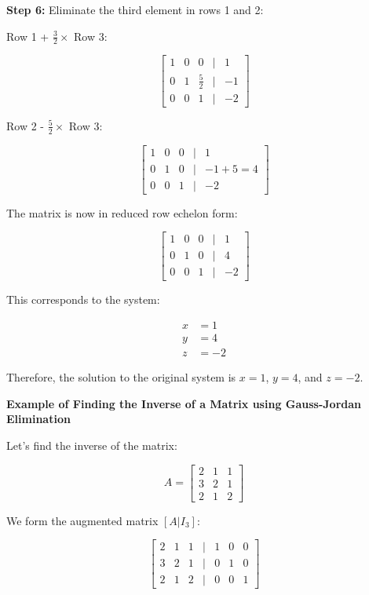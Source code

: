\textbf{Step 6:} Eliminate the third element in rows 1 and 2:

Row 1 + \(\frac{3}{2} \times\) Row 3:

\[
    \begin{bmatrix}
    1 & 0 & 0 & | & 1 \\
    0 & 1 & \frac{5}{2} & | & -1 \\
    0 & 0 & 1 & | & -2
    \end{bmatrix}
\]

Row 2 - \(\frac{5}{2} \times\) Row 3:

\[
    \begin{bmatrix}
    1 & 0 & 0 & | & 1 \\
    0 & 1 & 0 & | & -1 + 5 = 4 \\
    0 & 0 & 1 & | & -2
    \end{bmatrix}
\]

The matrix is now in reduced row echelon form:

\[
    \begin{bmatrix}
    1 & 0 & 0 & | & 1 \\
    0 & 1 & 0 & | & 4 \\
    0 & 0 & 1 & | & -2
    \end{bmatrix}
\]

This corresponds to the system:

\begin{align*}
    x &= 1 \\
    y &= 4 \\
    z &= -2
\end{align*}

Therefore, the solution to the original system is \(x = 1\), \(y = 4\), and \(z = -2\).

\textbf{Example of Finding the Inverse of a Matrix using Gauss-Jordan Elimination}

Let's find the inverse of the matrix:

\[
    A = 
    \begin{bmatrix}
    2 & 1 & 1 \\
    3 & 2 & 1 \\
    2 & 1 & 2
    \end{bmatrix}
\]

We form the augmented matrix \([A|I_3]\):

\[
    \begin{bmatrix}
    2 & 1 & 1 & | & 1 & 0 & 0 \\
    3 & 2 & 1 & | & 0 & 1 & 0 \\
    2 & 1 & 2 & | & 0 & 0 & 1
    \end{bmatrix}
\]

